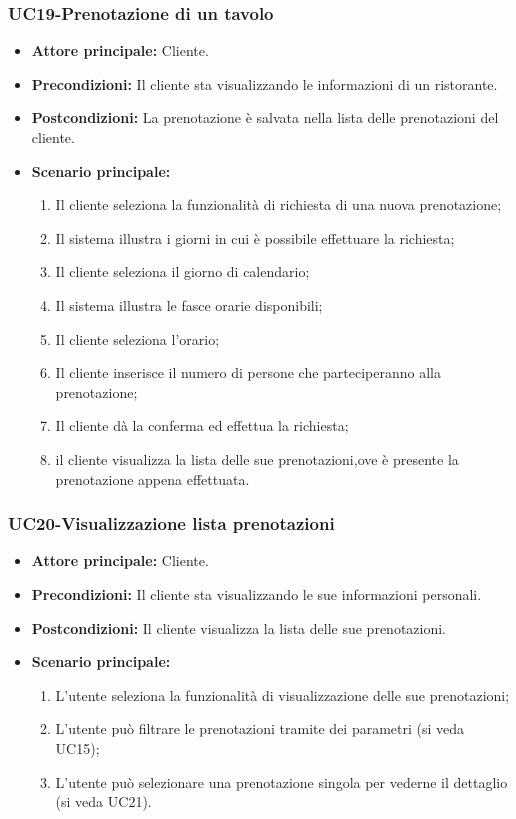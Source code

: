 \subsubsection{UC19-Prenotazione di un tavolo}
\begin{itemize}
    \item \textbf{Attore principale: }Cliente.
    \item \textbf{Precondizioni: }Il cliente sta visualizzando le informazioni di un ristorante.
    \item \textbf{Postcondizioni: }La prenotazione è salvata nella lista delle prenotazioni del cliente.
    \item \textbf{Scenario principale:}
        \begin{enumerate}
            \item Il cliente seleziona la funzionalità di richiesta di una nuova prenotazione;
            \item Il sistema illustra i giorni in cui è possibile effettuare la richiesta;
            \item Il cliente seleziona il giorno di calendario;
            \item Il sistema illustra le fasce orarie disponibili;
            \item Il cliente seleziona l'orario;
            \item Il cliente inserisce il numero di persone che parteciperanno alla prenotazione;
            \item Il cliente dà la conferma ed effettua la richiesta;
            \item il cliente visualizza la lista delle sue prenotazioni,ove è presente la prenotazione appena
            effettuata.
        \end{enumerate}
\end{itemize}

\subsubsection{UC20-Visualizzazione lista prenotazioni}
\begin{itemize}
    \item \textbf{Attore principale: } Cliente.
    \item \textbf{Precondizioni: }Il cliente sta visualizzando le sue informazioni personali.
    \item \textbf{Postcondizioni: }Il cliente visualizza la lista delle sue prenotazioni.
    \item \textbf{Scenario principale:}
        \begin{enumerate}
            \item L'utente seleziona la funzionalità di visualizzazione delle sue prenotazioni;
            \item L'utente può filtrare le prenotazioni tramite dei parametri (si veda UC15);
            \item L'utente può selezionare una prenotazione singola per vederne il dettaglio (si veda UC21).
        \end{enumerate}
\end{itemize}

